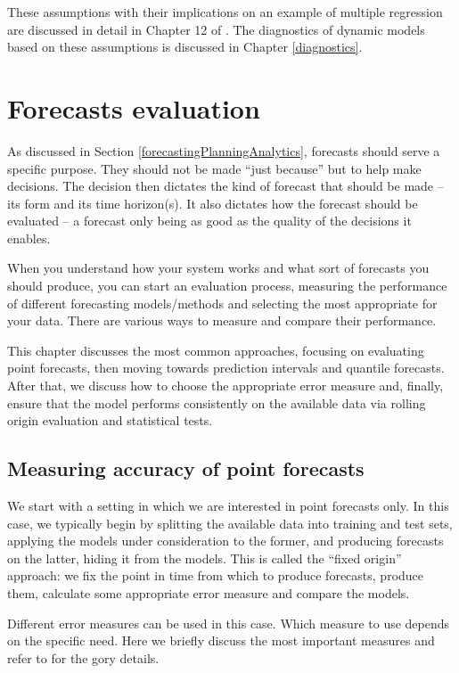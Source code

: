 \documentclass[]{book}
\theoremstyle{definition}
\theoremstyle{definition}
\theoremstyle{definition}
\theoremstyle{definition}
\theoremstyle{remark}
\begin{document}
These assumptions with their implications on an example of multiple regression are discussed in detail in Chapter 12 of \citet{SvetunkovSBA}. The diagnostics of dynamic models based on these assumptions is discussed in Chapter \ref{diagnostics}.

\hypertarget{forecastsEvaluation}{%
\chapter{Forecasts evaluation}\label{forecastsEvaluation}}

As discussed in Section \ref{forecastingPlanningAnalytics}, forecasts should serve a specific purpose. They should not be made ``just because'' but to help make decisions. The decision then dictates the kind of forecast that should be made -- its form and its time horizon(s). It also dictates how the forecast should be evaluated -- a forecast only being as good as the quality of the decisions it enables.

When you understand how your system works and what sort of forecasts you should produce, you can start an evaluation process, measuring the performance of different forecasting models/methods and selecting the most appropriate for your data. There are various ways to measure and compare their performance.

This chapter discusses the most common approaches, focusing on evaluating point forecasts, then moving towards prediction intervals and quantile forecasts. After that, we discuss how to choose the appropriate error measure and, finally, ensure that the model performs consistently on the available data via rolling origin evaluation and statistical tests.

\hypertarget{errorMeasures}{%
\section{Measuring accuracy of point forecasts}\label{errorMeasures}}

We start with a setting in which we are interested in point forecasts only. In this case, we typically begin by splitting the available data into training and test sets, applying the models under consideration to the former, and producing forecasts on the latter, hiding it from the models. This is called the ``fixed origin'' approach: we fix the point in time from which to produce forecasts, produce them, calculate some appropriate error measure and compare the models.

Different error measures can be used in this case. Which measure to use depends on the specific need. Here we briefly discuss the most important measures and refer to \citep{Davydenko2013, SvetunkovAccuracy2019, SvetunkovAPEs2017} for the gory details.
\end{document}
